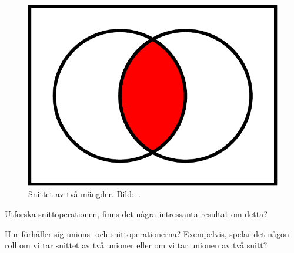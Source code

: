 \begin{figure}
\begin{minipage}{0.3\textwidth}
  \end{minipage}
  \hfill
  \begin{minipage}{0.3\textwidth}
    \includegraphics[width=\textwidth]{figs/intersection.pdf}
  \end{minipage}
  \caption{%
    Snittet av två mängder.
    Bild:~\cite{Wikipedia2013Set}.
  }\label{fig:Snitt}
\end{figure}

\begin{exercise}
  Utforska snittoperationen, finns det några intressanta resultat om detta?
\end{exercise}

\begin{exercise}
  Hur förhåller sig unions- och snittoperationerna?
  Exempelvis, spelar det någon roll om vi tar snittet av två unioner eller om 
  vi tar unionen av två snitt?
\end{exercise}

